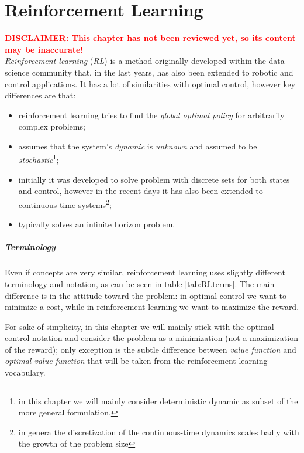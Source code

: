\chapter{Reinforcement Learning}
\textcolor{red}{\textbf{{\Large DISCLAIMER: This chapter has not been reviewed yet, so its content may be inaccurate!}}}
\\

	\textit{Reinforcement learning} (\textit{RL}) is a method originally developed within the data-science community that, in the last years, has also been extended to robotic and control applications. It has a lot of similarities with optimal control, however key differences are that:
	\begin{itemize}
		\item reinforcement learning tries to find the \textit{global optimal policy} for arbitrarily complex problems;
		\item assumes that the system's \textit{dynamic} is \textit{unknown} and assumed to be \textit{stochastic}\footnote{in this chapter we will mainly consider deterministic dynamic as subset of the more general formulation.};
		\item initially it was developed to solve problem with discrete sets for both states and control, however in the recent days it has also been extended to continuous-time systems\footnote{in genera the discretization of the continuous-time dynamics scales badly with the growth of the problem size};
		\item typically solves an infinite horizon problem.
	\end{itemize}

	\paragraph{Terminology} Even if concepts are very similar, reinforcement learning uses slightly different terminology and notation, as can be seen in table \ref{tab:RLterms}. The main difference is in the attitude toward the problem: in optimal control we want to minimize a cost, while in reinforcement learning we want to maximize the reward.
	
	
	
	For sake of simplicity, in this chapter we will mainly stick with the optimal control notation and consider the problem as a minimization (not a maximization of the reward); only exception is the subtle difference between \textit{value function} and \textit{optimal value function} that will be taken from the reinforcement learning vocabulary.
	
